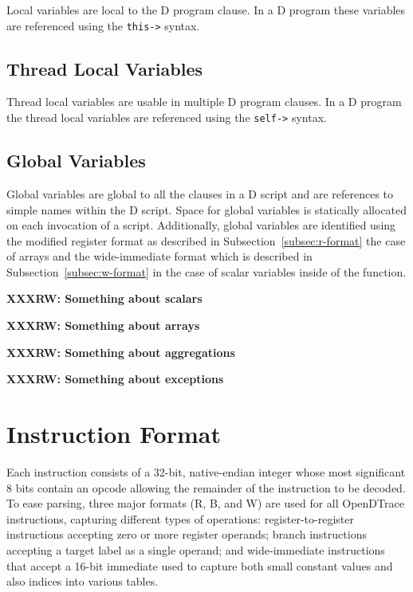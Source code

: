 Local variables are local to the D program clause.  In a D program
these variables are referenced using the \verb|this->| syntax.  

\subsection{Thread Local Variables}
\label{sec:thread-local-vars}

Thread local variables are usable in multiple D program clauses.  In a
D program the thread local variables are referenced using the
\verb|self->| syntax.

\subsection{Global Variables}
\label{sec:globals-vars}

Global variables are global to all the clauses in a D script and are references
to simple names within the D script.  Space for global variables is statically
allocated on each invocation of a script. Additionally, global variables are
identified using the modified register format as described in
Subsection~\ref{subsec:r-format} the case of arrays and the wide-immediate
format which is described in Subsection~\ref{subsec:w-format} in the case
of scalar variables inside of the  function.

\textbf{XXXRW: Something about scalars}

\textbf{XXXRW: Something about arrays}

\textbf{XXXRW: Something about aggregations}

\textbf{XXXRW: Something about exceptions}

\section{Instruction Format}

Each instruction consists of a 32-bit, native-endian integer whose most
significant 8 bits contain an opcode allowing the remainder of the instruction
to be decoded.
To ease parsing, three major formats (R, B, and W) are used for all OpenDTrace
instructions, capturing different types of operations: register-to-register
instructions accepting zero or more register operands; branch instructions
accepting a target label as a single operand; and wide-immediate instructions
that accept a 16-bit immediate used to capture both small constant values and
also indices into various tables.

